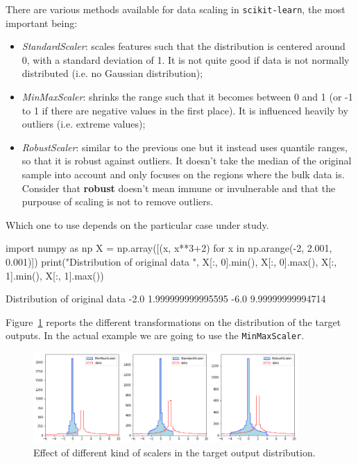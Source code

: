 There are various methods available for data scaling in \texttt{scikit-learn}, the most important being:
\begin{itemize}
\tightlist
\item \emph{StandardScaler}: scales features such that the distribution is centered around 0, with a standard deviation of 1. It is not quite good if data is not normally distributed (i.e. no Gaussian distribution);
\item \emph{MinMaxScaler}: shrinks the range such that it becomes between 0 and 1 (or -1 to 1 if there are negative values in the first place). It is influenced heavily by outliers (i.e. extreme values);
\item \emph{RobustScaler}: similar to the previous one but it instead uses quantile ranges, so that it is robust against outliers. It doesn't take the median of the original sample into account and only focuses on the regions where the bulk data is. Consider that \textbf{robust} doesn't mean immune or invulnerable and that the purpouse of scaling is not to remove outliers.
\end{itemize}

Which one to use depends on the particular case under study. 

\begin{ipython}
import numpy as np
X = np.array([(x, x**3+2) for x in np.arange(-2, 2.001, 0.001)])
print("Distribution of original data ", X[:, 0].min(), X[:, 0].max(), 
X[:, 1].min(), X[:, 1].max())
\end{ipython}
\begin{ioutput}
Distribution of original data  -2.0 1.999999999995595 -6.0 9.99999999994714
\end{ioutput}

Figure~\ref{fig:scalers} reports the different transformations on the distribution of the target outputs. In the actual example we are going to use the \texttt{MinMaxScaler}.

\begin{figure}[htb]
\centering
\includegraphics[width=0.9\textwidth]{figures/scalers}
\caption{Effect of different kind of scalers in the target output distribution.}
\label{fig:scalers}
\end{figure}


